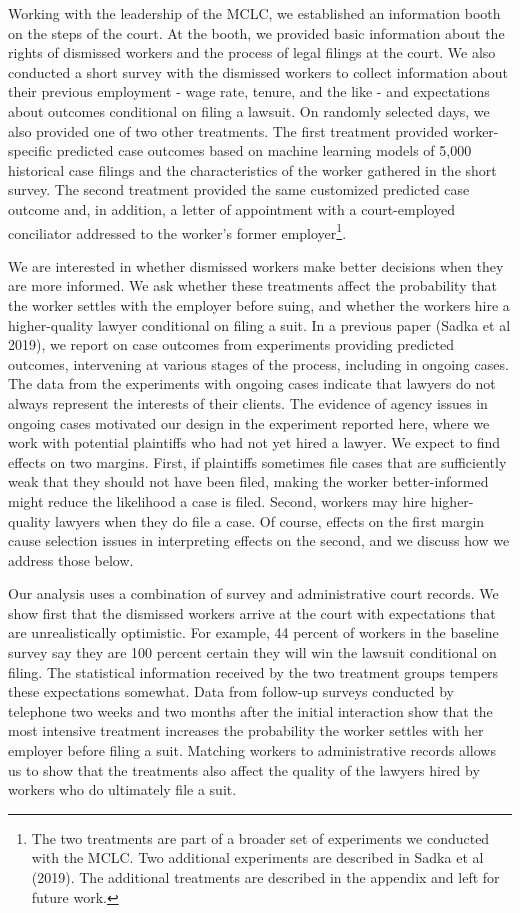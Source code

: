 \documentclass[12 pt]{article}
\begin{document}
Working with the leadership of the MCLC, we established an information booth on the steps of the court. At the booth, we provided basic information about the rights of dismissed workers and the process of legal filings at the court. We also conducted a short survey with the dismissed workers to collect information about their previous employment - wage rate, tenure, and the like - and expectations about outcomes conditional on filing a lawsuit. On randomly selected days, we also provided one of two other treatments. The first treatment provided worker-specific predicted case outcomes based on machine learning models of 5,000 historical case filings and the characteristics of the worker gathered in the short survey. The second treatment provided the same customized predicted case outcome and, in addition, a letter of appointment with a court-employed conciliator addressed to the worker’s former employer\footnote{The two treatments are part of a broader set of experiments we conducted with the MCLC. Two additional experiments are described in Sadka et al (2019). The additional treatments are described in the appendix and left for future work.}. 

We are interested in whether dismissed workers make better decisions when they are more informed. We ask whether these treatments affect the probability that the worker settles with the employer before suing, and whether the workers hire a higher-quality lawyer conditional on filing a suit. In a previous paper (Sadka et al 2019), we report on case outcomes from experiments providing predicted outcomes, intervening at various stages of the process, including in ongoing cases. The data from the experiments with ongoing cases indicate that lawyers do not always represent the interests of their clients. The evidence of agency issues in ongoing cases motivated our design in the experiment reported here, where we work with potential plaintiffs who had not yet hired a lawyer. We expect to find effects on two margins. First, if plaintiffs sometimes file cases that are sufficiently weak that they should not have been filed, making the worker better-informed might reduce the likelihood a case is filed. Second, workers may hire higher-quality lawyers when they do file a case. Of course, effects on the first margin cause selection issues in interpreting effects on the second, and we discuss how we address those below.  

Our analysis uses a combination of survey and administrative court records. We show first that the dismissed workers arrive at the court with expectations that are unrealistically optimistic. For example, 44 percent of workers in the baseline survey say they are 100 percent certain they will win the lawsuit conditional on filing. The statistical information received by the two treatment groups tempers these expectations somewhat. Data from follow-up surveys conducted by telephone two weeks and two months after the initial interaction show that the most intensive treatment increases the probability the worker settles with her employer before filing a suit. Matching workers to administrative records allows us to show that the treatments also affect the quality of the lawyers hired by workers who do ultimately file a suit. 
\end{document}
